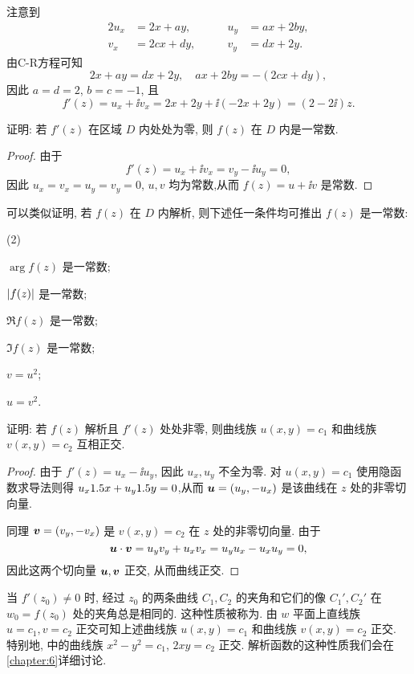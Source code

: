 \begin{solution}
  注意到
  \begin{alignat*}{2}
    u_x&=2x+ay,\qquad&u_y&=ax+2by,\\
    v_x&=2cx+dy,\qquad&v_y&=dx+2y.
  \end{alignat*}
  由C-R方程可知
  \[
    2x+ay=dx+2y,\quad ax+2by=-(2cx+dy),
  \]
  因此 $a=d=2$, $b=c=-1$, 且
  \[
     f'(z)
    =u_x+\ii v_x
    =2x+2y+\ii(-2x+2y)
    =(2-2\ii)z.
  \]
\end{solution}

\begin{example}
  \label{exam:zero-deriv-constant}
  证明: 若 $f'(z)$ 在区域 $D$ 内处处为零, 则 $f(z)$ 在 $D$ 内是一常数.
\end{example}

\begin{proof}
  由于
  \[
    f'(z)=u_x+\ii v_x=v_y-\ii u_y=0,
  \]
  因此 $u_x=v_x=u_y=v_y=0$, $u,v$ 均为常数,从而  $f(z)=u+\ii v$ 是常数.
\end{proof}

可以类似证明, 若 $f(z)$ 在 $D$ 内解析, 则下述任一条件均可推出 $f(z)$ 是一常数:
\begin{subexample}(2)
  \item $\arg{f(z)}$ 是一常数;
  \item $\left|f(z)\right|$ 是一常数;
  \item $\Re{f(z)}$ 是一常数;
  \item $\Im{f(z)}$ 是一常数;
  \item $v=u^2$;
  \item $u=v^2$.
\end{subexample}

\begin{example}
  \label{exam:orthogonal-curve}
  证明: 若 $f(z)$ 解析且 $f'(z)$ 处处非零, 则曲线族 $u(x,y)=c_1$ 和曲线族 $v(x,y)=c_2$ 互相正交.
\end{example}

\begin{proof}
  由于 $f'(z)=u_x-\ii u_y$, 因此 $u_x,u_y$ 不全为零.
  对 $u(x,y)=c_1$ 使用隐函数求导法则得 $u_x1.5 x+u_y1.5 y=0$,从而 ${\boldsymbol{u}}=(u_y,-u_x)$ 是该曲线在 $z$ 处的非零切向量.

  同理 ${\boldsymbol{v}}=(v_y,-v_x)$ 是 $v(x,y)=c_2$ 在 $z$ 处的非零切向量.
  由于
  \[
    {\boldsymbol{u}}\cdot{\boldsymbol{v}}=u_yv_y+u_xv_x=u_yu_x-u_xu_y=0,
  \]
  因此这两个切向量 ${\boldsymbol{u}},{\boldsymbol{v}}$ 正交, 从而曲线正交.
\end{proof}

当 $f'(z_0)\neq 0$ 时, 经过 $z_0$ 的两条曲线 $C_1,C_2$ 的夹角和它们的像 $C_1',C_2'$ 在 $w_0=f(z_0)$ 处的夹角总是相同的.
这种性质被称为.
由 $w$ 平面上直线族 $u=c_1,v=c_2$ 正交可知上述曲线族 $u(x,y)=c_1$ 和曲线族 $v(x,y)=c_2$ 正交.
特别地,  中的曲线族 $x^2-y^2=c_1$, $2xy=c_2$ 正交.
解析函数的这种性质我们会在\ref{chapter:6}详细讨论.




